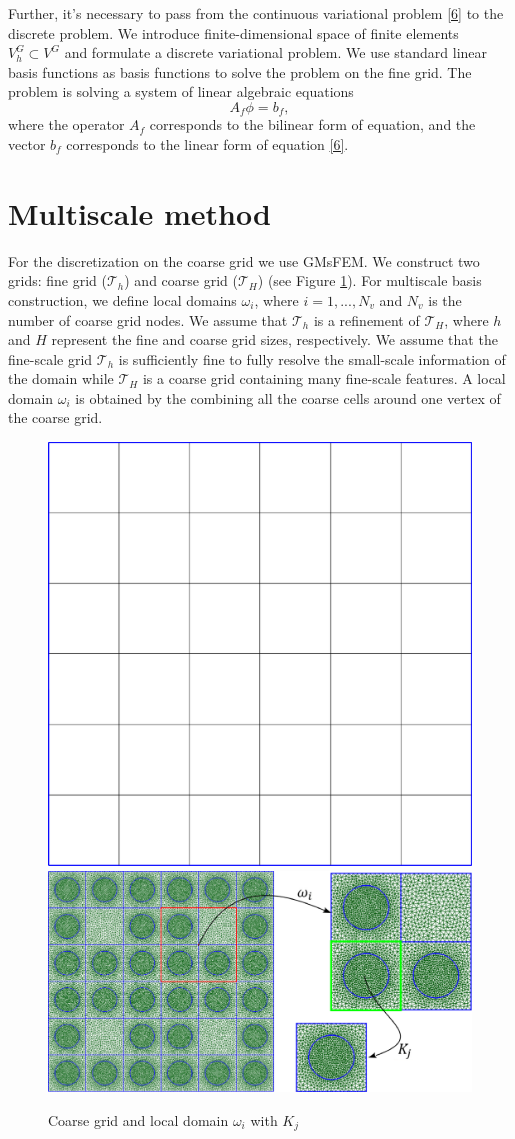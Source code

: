 \documentclass[preprint]{elsarticle}
\begin{document}
Further, it's necessary to pass from the continuous variational problem \eqref{6} to the discrete problem. 
We introduce finite-dimensional space of finite elements $V^G_h \subset V^G$ and formulate a discrete variational problem. 
We use standard linear basis functions as basis functions to solve the problem on the fine grid.
The problem is solving a system of linear algebraic equations
\begin{equation}\label{7}
	A_f \phi = b_f,
\end{equation}
where the operator $A_f$ corresponds to the bilinear form of equation, and the vector $b_f$ corresponds to the linear form of equation \eqref{6}.

\section{Multiscale method}
For the discretization on the coarse grid we use GMsFEM.
We construct two grids: fine grid ($\mathcal{T}_h$) and coarse grid ($\mathcal{T}_H$) (see Figure \ref{grid}).
For multiscale basis construction, we define local domains $\omega_i$, where $i = 1,..., N_v$ and $N_v$ is the number of coarse grid nodes.
We assume that $\mathcal{T}_h$ is a refinement of $\mathcal{T}_H$, where $h$ and $H$ represent the fine and coarse grid sizes, respectively. 
We assume that the fine-scale grid $\mathcal{T}_h$ is sufficiently fine to fully resolve the small-scale information of the domain  while $\mathcal{T}_H$ is a coarse grid containing many fine-scale features.
A local domain $\omega_i$ is obtained by the combining all the coarse cells around one vertex of the coarse grid. 

\begin{figure}[ht]
	\centering
		\includegraphics[width=0.3\linewidth]{coarse_grid.eps} \hspace{2em}
		\includegraphics[width=0.57\linewidth]{omega.eps} 
	\caption{Coarse grid and local domain $\omega_i$ with $K_j$}
	\label{grid}
\end{figure} 
\end{document}
